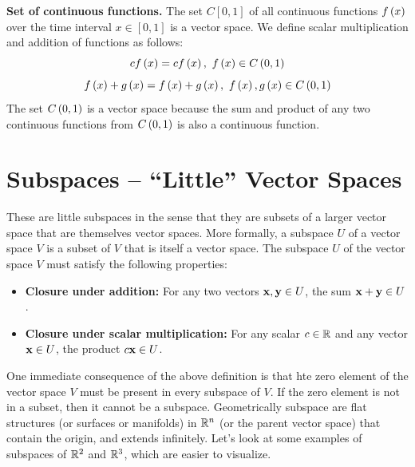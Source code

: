\begin{example}
    \textbf{Set of continuous functions.} The set $C\left[0, 1\right]$ of all continuous functions $f\left( x\right)$ over the time interval $x \in \left[ 0, 1\right]$ is a vector space. We define scalar multiplication and addition of functions as follows:
    \[ c f\left( x \right) = c f\left( x \right), \,\, f\left( x \right) \in C\left( 0, 1 \right) \]
    \[ f\left( x \right) + g\left( x \right) = f\left( x \right) + g\left( x \right), \,\, f\left( x \right), g\left( x \right) \in C\left( 0, 1 \right) \]
    The set $C\left( 0, 1 \right)$ is a vector space because the sum and product of any two continuous functions from $C\left( 0, 1 \right)$ is also a continuous function.
    \label{example:continuous-function-vector-space}
\end{example}

\section{Subspaces -- ``Little'' Vector Spaces}
These are little subspaces in the sense that they are subsets of a larger vector space that are themselves vector spaces. More formally, a subspace $U$ of a vector space $V$ is a subset of $V$ that is itself a vector space. The subspace $U$ of the vector space $V$ must satisfy the following properties:
\begin{itemize}
    \item \textbf{Closure under addition:} For any two vectors $\mathbf{x}, \mathbf{y} \in U$, the sum $\mathbf{x} + \mathbf{y} \in U$.
    \item \textbf{Closure under scalar multiplication:} For any scalar $c \in \mathbb{R}$ and any vector $\mathbf{x} \in U$, the product $c\mathbf{x} \in U$.
\end{itemize}
One immediate consequence of the above definition is that hte zero element of the vector space $V$ must be present in every subspace of $V$. If the zero element is not in a subset, then it cannot be a subspace. Geometrically subspace are flat structures (or surfaces or manifolds) in $\mathbb{R}^n$ (or the parent vector space) that contain the origin, and extends infinitely. Let's look at some examples of subspaces of $\mathbb{R}^2$ and $\mathbb{R}^3$, which are easier to visualize.

